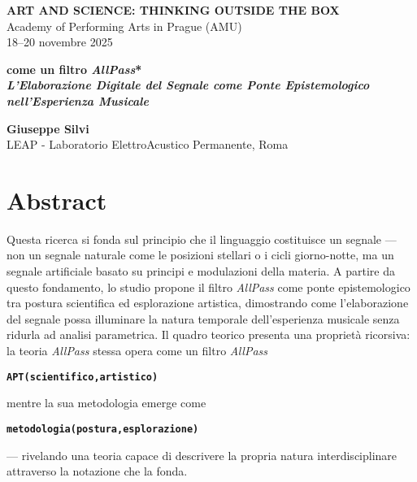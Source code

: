 \documentclass[12pt,a4paper]{article}
\newcommand{\apf}[3]{\textbf{\texttt{#1(#2,#3)}}}
\newcommand{\apfc}[3]{\begin{center}\apf{#1}{#2}{#3}\end{center}}
\begin{document}
\begin{center}
{\small \textbf{ART AND SCIENCE: THINKING OUTSIDE THE BOX} \\
Academy of Performing Arts in Prague (AMU) \\
18–20 novembre 2025}
\end{center}

\begin{center}
{\Large \textbf{come un filtro \emph{AllPass}*\\
{\textit{L'Elaborazione Digitale del Segnale come Ponte Epistemologico nell'Esperienza Musicale}}}}
\end{center}

\setcounter{footnote}{0}
\renewcommand{\thefootnote}{\fnsymbol{footnote}}
\renewcommand{\thefootnote}{\arabic{footnote}}
\setcounter{footnote}{0}

\begin{center}
\textbf{Giuseppe Silvi} \\
LEAP - Laboratorio ElettroAcustico Permanente, Roma
\end{center}

\section*{Abstract}

Questa ricerca si fonda sul principio che il linguaggio costituisce un segnale — non un segnale naturale come le posizioni stellari o i cicli giorno-notte, ma un segnale artificiale basato su principi e modulazioni della materia. A partire da questo fondamento, lo studio propone il filtro \emph{AllPass} come ponte epistemologico tra postura scientifica ed esplorazione artistica, dimostrando come l'elaborazione del segnale possa illuminare la natura temporale dell'esperienza musicale senza ridurla ad analisi parametrica. Il quadro teorico presenta una proprietà ricorsiva: la teoria \emph{AllPass} stessa opera come un filtro \emph{AllPass}

\apfc{APT}{scientifico}{artistico}

mentre la sua metodologia emerge come

\apfc{metodologia}{postura}{esplorazione}

— rivelando una teoria capace di descrivere la propria natura interdisciplinare attraverso la notazione che la fonda.
\end{document}
